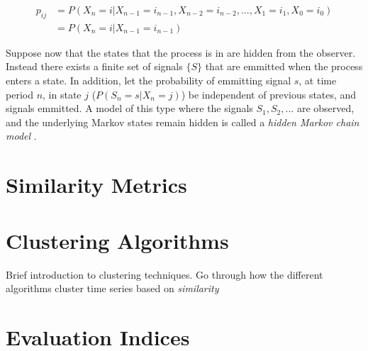 \begin{equation}
    \begin{split}
        p_{ij} &= P(X_n = i | X_{n-1} = i_{n-1}, X_{n-2} = i_{n-2},..., X_{1} = i_{1}, X_{0} = i_{0}) \\
        &= P(X_n = i| X_{n-1} = i_{n-1})      
    \end{split}
    \label{eq:markov_property}
\end{equation}


Suppose now that the states that the process is in are hidden from the observer. Instead there exists a finite set of signals $\{S\}$ that are emmitted when the process enters a state. In addition, let the probability of emmitting signal $s$, at time period $n$, in state $j$ ($P(S_n = s | X_n = j)$) be independent of previous states, and signals emmitted. A model of this type where the signals $S_1, S_2, ...$ are observed, and the underlying Markov states remain hidden is called a \textit{hidden Markov chain model} \cite{stoch_pros}. 

\section{Similarity Metrics}

\section{Clustering Algorithms}
Brief introduction to clustering techniques. Go through how the different algorithms cluster time series based on \textit{similarity}

\section{Evaluation Indices} 